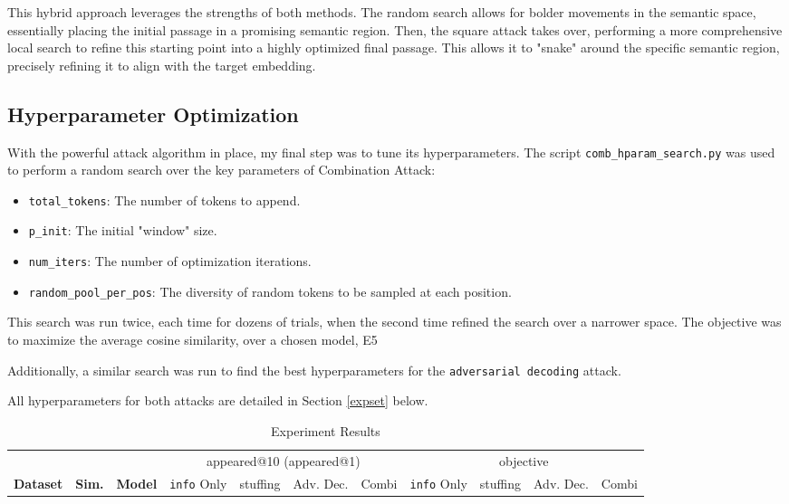 \documentclass[a4paper, sigconf]{acmart}
\begin{document}
This hybrid approach leverages the strengths of both methods. The random search allows for bolder movements in the semantic space, essentially placing the initial passage in a promising semantic region. Then, the square attack takes over, performing a more comprehensive local search to refine this starting point into a highly optimized final passage. This allows it to "snake" around the specific semantic region, precisely refining it to align with the target embedding.


\subsection{Hyperparameter Optimization}

With the powerful attack algorithm in place, my final step was to tune its hyperparameters. The script \texttt{comb\_hparam\_search.py} was used to perform a random search over the key parameters of Combination Attack:

\begin{itemize}
  \item \texttt{total\_tokens}: The number of tokens to append.
  \item \texttt{p\_init}: The initial "window" size.
  \item \texttt{num\_iters}: The number of optimization iterations.
  \item \texttt{random\_pool\_per\_pos}: The diversity of random tokens to be sampled at each position.
\end{itemize}

This search was run twice, each time for dozens of trials, when the second time refined the search over a narrower space. The objective was to maximize the average cosine similarity, over a chosen model, E5 \cite{e5}

Additionally, a similar search was run to find the best hyperparameters for the \texttt{adversarial decoding} attack.

All hyperparameters for both attacks are detailed in Section \ref{expset} below.  


\begin{table*}
\caption{Experiment Results}
\label{table:res}
\begin{tabular}{lll|cccc|cccc}
  \hline
   & & & \multicolumn{4}{c}{appeared@10 (appeared@1)} & \multicolumn{4}{c}{objective} \\
  \textbf{Dataset} & \textbf{Sim.} & \textbf{Model} & \texttt{info} Only & stuffing & Adv. Dec. & Combi & \texttt{info} Only & stuffing & Adv. Dec. & Combi \\
  \hline
 
 \end{tabular}
\end{table*}
\end{document}
